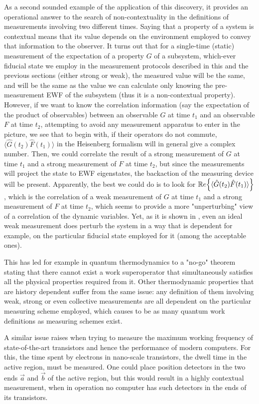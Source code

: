 \documentclass[11pt, a4paper]{article} %
\begin{document}
As a second sounded example of the application of this discovery, it provides an operational answer to the search of non-contextuality in the definitions of measurements involving two different times. Saying that a property of a system is contextual means that its value depends on the environment employed to convey that information to the observer. It turns out that for a single-time (static) measurement of the expectation of a property $G$ of a subsystem, which-ever fiducial state we employ in the measurement protocols described in this and the previous sections (either strong or weak), the measured value will be the same, and will be the same as the value we can calculate only knowing the pre-measurement EWF of the subsystem (thus it is a non-contextual property). However, if we want to know the correlation information (say the expectation of the product of observables) between an observable $G$ at time $t_1$ and an observable $F$ at time $t_2$, attempting to avoid any measurement apparatus to enter in the picture, we see that to begin with, if their operators do not commute, $\langle \hat{G}(t_2)\hat{F}(t_1)\rangle$ in the Heisenberg formalism will in general give a complex number. Then, we could correlate the result of a strong measurement of $G$ at time $t_1$ and a strong measurement of $F$ at time $t_2$, but since the measurements will project the state to EWF eigenstates, the backaction of the measuring device will be present. Apparently, the best we could do is to look for $\mathbb{R}e \qty{\langle \hat{G}(t_2)\hat{F}(t_1)\rangle}$, which is the correlation of a weak measurement of $G$ at time $t_1$ and a strong measurement of $F$ at time $t_2$, which seems to provide a more "unperturbing" view of a correlation of the dynamic variables. Yet, as it is shown in \cite{DevInPosition1}, even an ideal weak measurement does perturb the system in a way that is dependent for example, on the particular fiducial state employed for it (among the acceptable ones).

This has led for example in quantum thermodynamics to a "no-go" theorem \cite{nogo} stating that there cannot exist a work superoperator that simultaneously satisfies all the physical properties required from it. Other thermodynamic properties that are history dependent suffer from the same issue: any definition of them involving weak, strong or even collective measurements are all dependent on the particular measuring scheme employed, which causes to be as many quantum work definitions as measuring schemes exist.

A similar issue raises when trying to measure the maximum working frequency of state-of-the-art transistors and hence the performance of modern computers. For this, the time spent by electrons in nano-scale transistors, the dwell time in the active region, must be measured. One could place position detectors in the two ends $\vec{a}$ and $\vec{b}$ of the active region, but this would result in a highly contextual measurement, when in operation no computer has such detectors in the ends of its transistors. 
\end{document}
